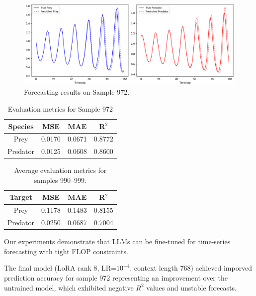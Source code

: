 \documentclass[a4paper,12pt]{article}
\begin{document}
\begin{figure}[H]
    \centering
    \includegraphics[width=0.95\linewidth]{sample972_trained.png}
    \caption{Forecasting results on Sample 972.}
    \label{fig:sample_prediction}
\end{figure}

\begin{table}[H]
    \centering

    \begin{tabular}{|c|c|c|c|}
        \hline
        \textbf{Species} & \textbf{MSE} & \textbf{MAE} & \textbf{R$^2$} \\
        \hline
        Prey & 0.0170 & 0.0671 & 0.8772 \\
        Predator & 0.0125 & 0.0608 & 0.8600 \\
        \hline
    \end{tabular}
    \vspace{0.2cm}
    \caption{Evaluation metrics for Sample 972}
    \label{tab:metrics_sample972}
\end{table}

\begin{table}[H]
  \centering
  \begin{tabular}{|c|c|c|c|}
      \hline
      \textbf{Target} & \textbf{MSE} & \textbf{MAE} & \textbf{R$^2$} \\
      \hline
      Prey & 0.1178 & 0.1483 & 0.8155 \\
      Predator & 0.0250 & 0.0687 & 0.7004 \\
      \hline
  \end{tabular}
  \vspace{0.2cm}
  \caption{Average evaluation metrics for samples 990–999.}
  \label{tab:avg_metrics_990_999}
  \end{table}

  Our experiments demonstrate that LLMs can be fine-tuned for time-series forecasting with tight FLOP constraints.
  
  The final model (LoRA rank 8, LR=$10^{-4}$, context length 768) achieved imporved prediction accuracy for sample 972 representing an improvement over the untrained model, which exhibited negative $R^2$ values and unstable forecasts.
  
\end{document}
